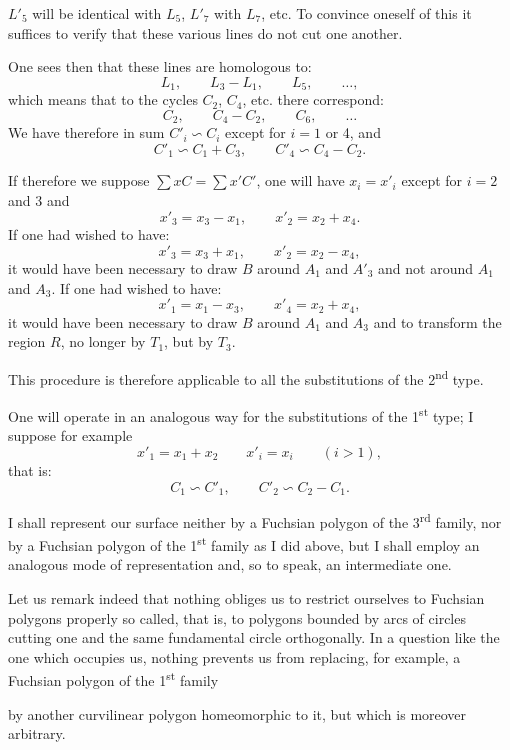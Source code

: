 \documentclass{article}
\begin{document}
$L'_{5}$ will be identical with $L_{5}$, $L'_{7}$ with $L_{7}$, etc. To convince oneself of this it suffices to verify that these various lines do not cut one another.

One sees then that these lines are homologous to:
\[ L_{1}, \qquad L_{3} - L_{1}, \qquad L_{5}, \qquad \ldots, \]
which means that to the cycles $C_{2}$, $C_{4}$, etc. there correspond:
\[ C_{2}, \qquad C_{4} - C_{2}, \qquad C_{6}, \qquad \ldots \]
We have therefore in sum $C'_{i} \backsim C_{i}$ except for $i = 1$ or 4, and
\[ C'_{1} \backsim C_{1} + C_{3}, \qquad C'_{4} \backsim C_{4} - C_{2}. \]

If therefore we suppose $\displaystyle\sum x C = \displaystyle\sum x' C'$, one will have $x_{i} = x'_{i}$ except for $i = 2$ and 3 and
\[ x'_{3} = x_{3} - x_{1}, \qquad x'_{2} = x_{2} + x_{4}. \]
If one had wished to have:
\[ x'_{3} = x_{3} + x_{1}, \qquad x'_{2} = x_{2} - x_{4}, \]
it would have been necessary to draw $B$ around $A_{1}$ and $A'_{3}$ and not around $A_{1}$ and $A_{3}$. If one had wished to have:
\[ x'_{1} = x_{1} - x_{3}, \qquad x'_{4} = x_{2} + x_{4}, \]
it would have been necessary to draw $B$ around $A_{1}$ and $A_{3}$ and to transform the region $R$, no longer by $T_{1}$, but by $T_{3}$.

This procedure is therefore applicable to all the substitutions of the 2\textsuperscript{nd} type.

One will operate in an analogous way for the substitutions of the 1\textsuperscript{st} type; I suppose for example
\[ x'_{1} = x_{1} + x_{2} \qquad x'_{i} = x_{i} \qquad (i > 1), \]
that is:
\[ C_{1} \backsim C'_{1}, \qquad C'_{2} \backsim C_{2} - C_{1}. \]

I shall represent our surface neither by a Fuchsian polygon of the 3\textsuperscript{rd} family, nor by a Fuchsian polygon of the 1\textsuperscript{st} family as I did above, but I shall employ an analogous mode of representation and, so to speak, an intermediate one.

Let us remark indeed that nothing obliges us to restrict ourselves to Fuchsian polygons properly so called, that is, to polygons bounded by arcs of circles cutting one and the same fundamental circle orthogonally. In a question like the one which occupies us, nothing prevents us from replacing, for example, a Fuchsian polygon of the 1\textsuperscript{st} family

by another curvilinear polygon homeomorphic to it, but which is moreover arbitrary.
\end{document}
